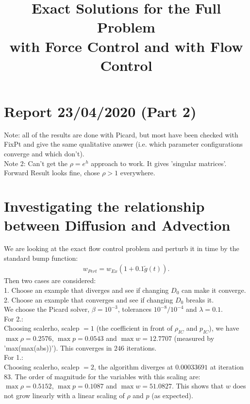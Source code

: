 \documentclass[11pt, a4paper]{article}
\title{Exact Solutions for the Full Problem \\with Force Control and with Flow Control}
\date{}
\theoremstyle{definition}
\begin{document}
\section*{Report 23/04/2020 (Part 2)}
Note: all of the results are done with Picard, but most have been checked with FixPt and give the same qualitative answer (i.e. which parameter configurations converge and which don't).\\
Note 2: Can't get the $\rho = e^h$ approach to work. It gives 'singular matrices'. Forward Result looks fine, chose $\rho >1$ everywhere.
\section{Investigating the relationship between Diffusion and Advection}
We are looking at the exact flow control problem and perturb it in time by the standard bump function:
\begin{align*}
w_{Pert} = w_{Ex} (1 + 0.1\tilde g(t)).
\end{align*}
Then two cases are considered:\\
1. Choose an example that diverges and see if changing $D_0$ can make it converge.\\
2. Choose an example that converges and see if changing $D_0$ breaks it.\\
We choose the Picard solver, $\beta = 10^{-3}$, tolerances $10^{-8}/10^{-4}$ and $\lambda =0.1$.\\
For 2.:\\
Choosing scalerho, scalep $=1$ (the coefficient in front of $\rho_{IC}$ and $p_{IC}$), we have $\max \rho = 0.2576$, $\max p = 0.0543$ and $\max w = 12.7707$ (measured by 'max(max(abs))'). This converges in $246$ iterations.\\
For 1.:\\
Choosing scalerho, scalep $=2$, the algorithm diverges at $0.00033691$ at iteration $83$. The order of magnitude for the variables with this scaling are: $\max \rho = 0.5152$, $\max p = 0.1087$ and $\max w = 51.0827$. This shows that $w$ does not grow linearly with a linear scaling of $\rho$ and $p$ (as expected).
\end{document}

